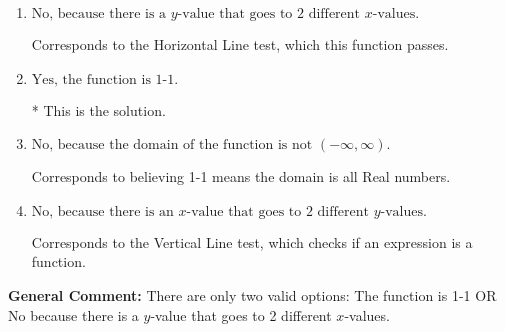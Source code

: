 \documentclass{extbook}[14pt]
\begin{document}
\begin{enumerate}
{\begin{enumerate}[label=\Alph*.]
Corresponds to believing 1-1 means the range is all Real numbers.
\item \( \text{No, because there is a $y$-value that goes to 2 different $x$-values.} \)

Corresponds to the Horizontal Line test, which this function passes.
\item \( \text{Yes, the function is 1-1.} \)

* This is the solution.
\item \( \text{No, because the domain of the function is not $(-\infty, \infty)$.} \)

Corresponds to believing 1-1 means the domain is all Real numbers.
\item \( \text{No, because there is an $x$-value that goes to 2 different $y$-values.} \)

Corresponds to the Vertical Line test, which checks if an expression is a function.
\end{enumerate}

\textbf{General Comment:} There are only two valid options: The function is 1-1 OR No because there is a $y$-value that goes to 2 different $x$-values.
}
\end{enumerate}
\end{document}
